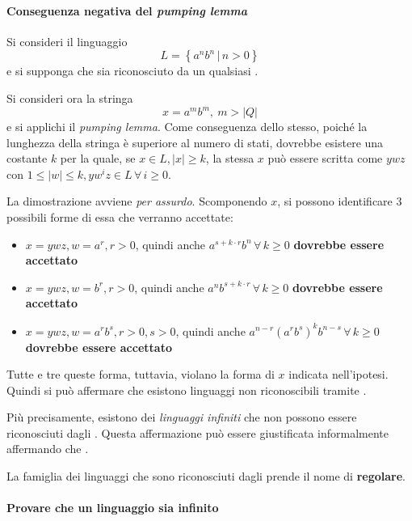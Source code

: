 \documentclass[italian, 10pt]{article}
\begin{document}
\paragraph{Conseguenza negativa del \textit{pumping lemma}}
\label{par:conseguenza-negativa-pumping-lemma}

Si consideri il linguaggio
\[ L = \left\{ a^n b^n \, | \, n > 0 \right\} \]
e si supponga che sia riconosciuto da un qualsiasi \FSA.

\bigskip
Si consideri ora la stringa
\[ x = a^m b^m, \  m > |Q| \]
e si applichi il \textit{pumping lemma}.
Come conseguenza dello stesso, poiché la lunghezza della stringa è superiore al numero di stati, dovrebbe esistere una costante \(k\) per la quale, se \(x \in L, |x| \geq k\), la stessa \(x\) può essere scritta come \(ywz\) con \(1 \leq |w| \leq k, yw^iz \in L \, \forall \, i \geq 0\).

La dimostrazione avviene \textit{per assurdo}.
Scomponendo \(x\), si possono identificare \(3\) possibili forme di essa che verranno accettate:

\begin{itemize}
  \item \(x = ywz, w = a^r, r > 0\), quindi anche \(a^{s + k \cdot r} b^n \, \forall \, k \geq 0\) \textbf{dovrebbe essere accettato}
  \item \(x = ywz, w = b^r, r > 0\), quindi anche \(a^n b^{s + k \cdot r} \, \forall \, k \geq 0\) \textbf{dovrebbe essere accettato}
  \item \(x = ywz, w = a^r b^s, r > 0, s > 0\), quindi anche \(a^{n - r} (a^r b^s)^k b^{n-s} \, \forall \, k \geq 0\) \textbf{dovrebbe essere accettato}
\end{itemize}

Tutte e tre queste forma, tuttavia, violano la forma di \(x\) indicata nell'ipotesi.
Quindi si può affermare che esistono linguaggi non riconoscibili tramite \FSA.

Più precisamente, esistono dei \textit{linguaggi infiniti} che non possono essere riconosciuti dagli \FSA.
Questa affermazione può essere giustificata informalmente affermando che .

La famiglia dei linguaggi che sono riconosciuti dagli \FSA prende il nome di \textbf{regolare}.

\paragraph{Provare che un linguaggio sia infinito}
\end{document}
